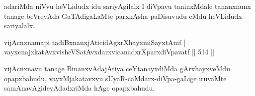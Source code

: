 \begin{artha}
adariMda niVvu heVLidudx idu sariyAgilalx I diVpavu taninxMdale tananxnunx tanage beVreyAda GaTAdigaLaMte parxkAsha paDisuvudu eMdu heVLidudx sariyalalx.
\end{artha}


\begin{shl}
\footnotemark[2]vijAcnxnamapi tadiBxnanxjAticidAgxrXhayxmiSayxtAmf | \\
vayxcnajxkatAvxvisheVSatAvxdarxvicanadxrXparxdiVpavatf \hfill||  514 ||  
\end{shl}

\begin{artha}
vijAcnxnavu tanage BinanxvAdajAtiya ceYtanayxdiMda gArxhayxveMdu opapxbahudu, vayxMjakatavxvu sUyaR-caMdarx-diVpa-gaLige iruvaMte samAnavAgideyAdadxriMda hAge opapxbahudu.
\end{artha}
